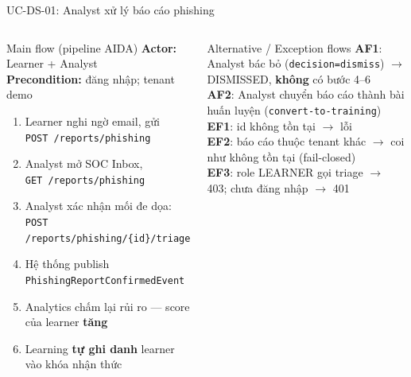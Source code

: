 \documentclass[aspectratio=169,12pt]{beamer}
\begin{document}
\begin{frame}[shrink=16]{UC-DS-01: Analyst xử lý báo cáo phishing}
  \begin{columns}[T,totalwidth=\textwidth]
    \small
    \begin{block}{Main flow (pipeline AIDA)}
      \textbf{Actor:} Learner + Analyst\\
      \textbf{Precondition:} đăng nhập; tenant demo\\[0.2em]
      \begin{enumerate}
        \item Learner nghi ngờ email, gửi\\ \texttt{POST /reports/phishing}
        \item Analyst mở SOC Inbox,\\ \texttt{GET /reports/phishing}
        \item Analyst xác nhận mối đe dọa:\\ \texttt{POST /reports/phishing/\{id\}/triage}
        \item Hệ thống publish \texttt{PhishingReportConfirmedEvent}
        \item Analytics chấm lại rủi ro --- score của learner \textbf{tăng}
        \item Learning \textbf{tự ghi danh} learner vào khóa nhận thức
      \end{enumerate}
    \end{block}

    \small
    \begin{alertblock}{Alternative / Exception flows}
      \textbf{AF1}: Analyst bác bỏ (\texttt{decision=dismiss})
      $\to$ DISMISSED, \textbf{không} có bước 4--6\\[0.25em]
      \textbf{AF2}: Analyst chuyển báo cáo thành bài huấn luyện
      (\texttt{convert-to-training})\\[0.25em]
      \textbf{EF1}: id không tồn tại $\to$ lỗi\\[0.25em]
      \textbf{EF2}: báo cáo thuộc tenant khác $\to$ coi như không tồn tại
      (fail-closed)\\[0.25em]
      \textbf{EF3}: role LEARNER gọi triage $\to$ 403;
      chưa đăng nhập $\to$ 401
    \end{alertblock}
  \end{columns}
\end{frame}
\end{document}
